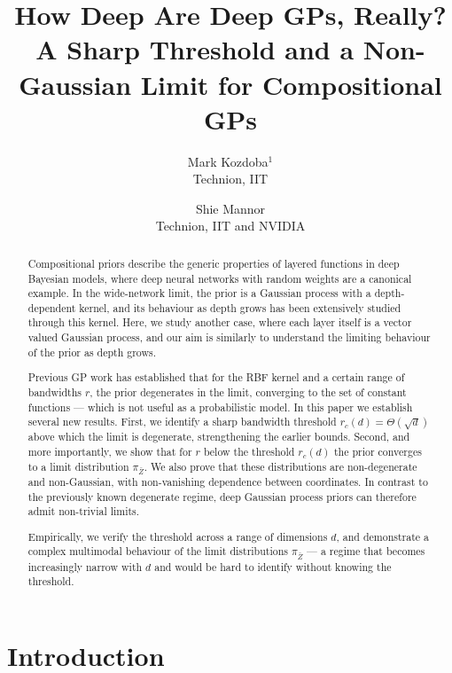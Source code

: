 \documentclass{article}
\title{How Deep Are Deep GPs, Really? A Sharp Threshold and a Non-Gaussian Limit for Compositional GPs}
\author{
  Mark Kozdoba$^{1}$\\
  Technion, IIT
  \and
  Shie Mannor\\
  Technion, IIT and NVIDIA
}
\date{}
\newcommand{\bZ}{\bar{Z}}
\begin{document}
\maketitle
{}

 \begin{abstract}
    Compositional priors describe the generic properties of layered functions in deep Bayesian models, where deep neural networks with random weights are a canonical example.
    In the wide-network limit, the prior is a Gaussian process with a depth-dependent kernel, and its behaviour as depth grows has been extensively studied through this kernel.
    Here, we study another case, where each layer itself is a vector valued Gaussian process, and our aim is similarly to understand the limiting behaviour of the prior as depth grows.

    
    Previous GP work has established that for the RBF kernel and a certain range of bandwidths $r$, the prior degenerates in the limit, converging to the set of constant functions --- which is not useful as a probabilistic model. In this paper we establish several new results.
    First, we identify a sharp bandwidth threshold $r_c(d) = \Theta(\sqrt{d})$ above which the limit is degenerate, strengthening the earlier bounds. Second, and more importantly, we show that for $r$ below the threshold $r_c(d)$ the prior converges to a limit distribution $\pi_{\bZ}$.  We also prove that these distributions are non-degenerate and non-Gaussian, with non-vanishing dependence between coordinates. In contrast to the previously known degenerate regime, deep Gaussian process priors can therefore admit non-trivial limits.

    Empirically, we verify the threshold across a range of dimensions $d$, and demonstrate a complex multimodal behaviour of the limit distributions $\pi_{\bZ}$ --- a regime that becomes increasingly narrow with $d$ and would be hard to identify without knowing the threshold.
\end{abstract}

\section{Introduction}
\label{sec:introduction}
\end{document}
